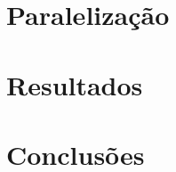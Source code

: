 \documentclass[12pt]{article}
\begin{document}

\section {Paralelização}

\section{Resultados}



\section{Conclusões}





\end{document}
